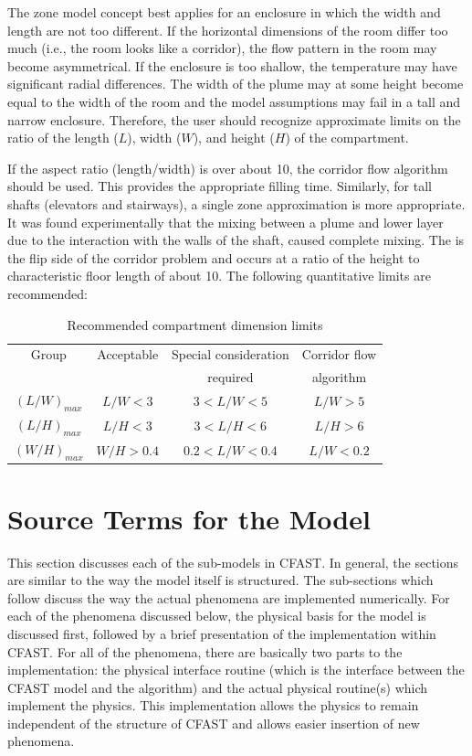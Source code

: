 The zone model concept best applies for an enclosure in which the width and length are not too
different. If the horizontal dimensions of the room differ too much (i.e., the room looks like a
corridor), the flow pattern in the room may become asymmetrical. If the enclosure is too
shallow, the temperature may have significant radial differences. The width of the plume may at
some height become equal to the width of the room and the model assumptions may fail in a tall
and narrow enclosure. Therefore, the user should recognize approximate limits on the ratio of the
length ($L$), width ($W$), and height ($H$) of the compartment.

If the aspect ratio (length/width) is over about 10, the corridor flow algorithm should be used.
This provides the appropriate filling time. Similarly, for tall shafts (elevators and stairways), a
single zone approximation is more appropriate. It was found experimentally \cite{Klote:1990} that the mixing
between a plume and lower layer due to the interaction with the walls of the shaft, caused
complete mixing. The is the flip side of the corridor problem and occurs at a ratio of the height
to characteristic floor length of about 10. The following quantitative limits are recommended:

\begin{table}[h]
\begin{center}
\caption{Recommended compartment dimension limits}
\label{tab:compartment_limits}
\vspace{0.1in}
\begin{tabular}{|c|c|c|c|}
\hline
Group & Acceptable & Special consideration & Corridor flow \\
 & & required & algorithm \\ \hline
$(L/W)_{max}$ & $L/W < 3$ & $3 < L/W < 5$ & $L/W > 5$ \\ \hline
$(L/H)_{max}$ &  $L/H < 3$ & $3 < L/H < 6$ & $L/H > 6$ \\ \hline
 $(W/H)_{max}$ & $W/H > 0.4$ & $0.2 < L/W < 0.4$ & $L/W < 0.2$ \\ \hline
\end{tabular}
\end{center}
\end{table}

\section{Source Terms for the Model}

This section discusses each of the sub-models in CFAST. In general, the sections are similar to
the way the model itself is structured. The sub-sections which follow discuss the way the actual
phenomena are implemented numerically. For each of the phenomena discussed below, the
physical basis for the model is discussed first, followed by a brief presentation of the
implementation within CFAST. For all of the phenomena, there are basically two parts to the
implementation: the physical interface routine (which is the interface between the CFAST
model and the algorithm) and the actual physical routine(s) which implement the physics. This
implementation allows the physics to remain independent of the structure of CFAST and allows
easier insertion of new phenomena.

